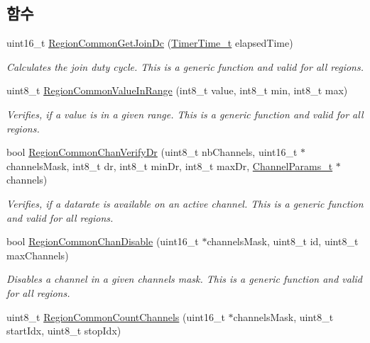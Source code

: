 \subsection*{함수}
\begin{DoxyCompactItemize}
\item 
uint16\+\_\+t \mbox{\hyperlink{group___r_e_g_i_o_n_c_o_m_m_o_n_ga672466fcf1aedaaf075cdabf49bc0c28}{Region\+Common\+Get\+Join\+Dc}} (\mbox{\hyperlink{utilities_8h_a4215ca43d3e953099ea758ce428599d0}{Timer\+Time\+\_\+t}} elapsed\+Time)
\begin{DoxyCompactList}\small\item\em Calculates the join duty cycle. This is a generic function and valid for all regions. \end{DoxyCompactList}\item 
uint8\+\_\+t \mbox{\hyperlink{group___r_e_g_i_o_n_c_o_m_m_o_n_gafdd1c80d953e18d755a631b72a9c3bd3}{Region\+Common\+Value\+In\+Range}} (int8\+\_\+t value, int8\+\_\+t min, int8\+\_\+t max)
\begin{DoxyCompactList}\small\item\em Verifies, if a value is in a given range. This is a generic function and valid for all regions. \end{DoxyCompactList}\item 
bool \mbox{\hyperlink{group___r_e_g_i_o_n_c_o_m_m_o_n_ga94ce5c6e759081853eb06d1dcffdab25}{Region\+Common\+Chan\+Verify\+Dr}} (uint8\+\_\+t nb\+Channels, uint16\+\_\+t $\ast$channels\+Mask, int8\+\_\+t dr, int8\+\_\+t min\+Dr, int8\+\_\+t max\+Dr, \mbox{\hyperlink{group___l_o_r_a_m_a_c_ga1360ca6f82c6d125ea43a9dad9b56184}{Channel\+Params\+\_\+t}} $\ast$channels)
\begin{DoxyCompactList}\small\item\em Verifies, if a datarate is available on an active channel. This is a generic function and valid for all regions. \end{DoxyCompactList}\item 
bool \mbox{\hyperlink{group___r_e_g_i_o_n_c_o_m_m_o_n_ga695c0ab2a06edcae5b33772f639fb676}{Region\+Common\+Chan\+Disable}} (uint16\+\_\+t $\ast$channels\+Mask, uint8\+\_\+t id, uint8\+\_\+t max\+Channels)
\begin{DoxyCompactList}\small\item\em Disables a channel in a given channels mask. This is a generic function and valid for all regions. \end{DoxyCompactList}\item 
uint8\+\_\+t \mbox{\hyperlink{group___r_e_g_i_o_n_c_o_m_m_o_n_gac23f0831812f610f57f42f6cf87368c9}{Region\+Common\+Count\+Channels}} (uint16\+\_\+t $\ast$channels\+Mask, uint8\+\_\+t start\+Idx, uint8\+\_\+t stop\+Idx)

\end{DoxyCompactItemize}
